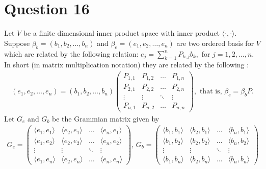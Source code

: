 \section{Question 16}
\horz
Let $V$ be a finite dimensional inner product space with inner product $\langle\cdot ,\cdot \rangle.$ Suppose $\beta_b= (b_1,b_2,\ldots,b_n)$ and  $\beta_e=(e_1,e_2,\ldots,e_n)$ are two ordered basis for $V$ which are related by the following relation:
$e_ j= \sum_{k=1}^n P_{k,j}b_k,$ for $j=1,2,\ldots,n.$ In short (in matrix multiplication notation) they are related by the following :
\begin{align*} \label{Basis change matrix}
(e_1,e_2,\ldots,e_n)= (b_1,b_2,\ldots,b_n)\begin{pmatrix}
P_{1,1} & P_{1,2}& \ldots & P_{1,n}\\
P_{2,1} & P_{2,2}& \ldots & P_{2,n}\\
\vdots & \vdots & \ddots & \vdots\\
P_{n,1} & P_{n,2}& \ldots & P_{n,n}
\end{pmatrix},  \,\,\mbox{that is,}\,\,\beta_e=\beta_b P.
\end{align*}
Let $G_e$ and $G_b$  be the Grammian matrix given by 
\begin{align*}
G_e= \begin{pmatrix}
\langle e_1,e_1\rangle & \langle e_2,e_1\rangle & \ldots & \langle e_n,e_1\rangle\\
\langle e_1,e_2\rangle & \langle e_2,e_2\rangle & \ldots & \langle e_n,e_2\rangle\\
\vdots & \vdots & \ddots & \vdots\\
\langle e_1,e_n\rangle & \langle e_2,e_n\rangle & \ldots & \langle e_n,e_n\rangle
\end{pmatrix}, \,G_b= \begin{pmatrix}
\langle b_1,b_1\rangle & \langle b_2,b_1\rangle & \ldots & \langle b_n,b_1\rangle\\
\langle b_1,b_2\rangle & \langle b_2,b_2\rangle & \ldots & \langle b_n,b_2\rangle\\
\vdots & \vdots & \ddots & \vdots\\
\langle b_1,b_n\rangle & \langle b_2,b_n\rangle & \ldots & \langle b_n,b_n\rangle
\end{pmatrix}
\end{align*}
